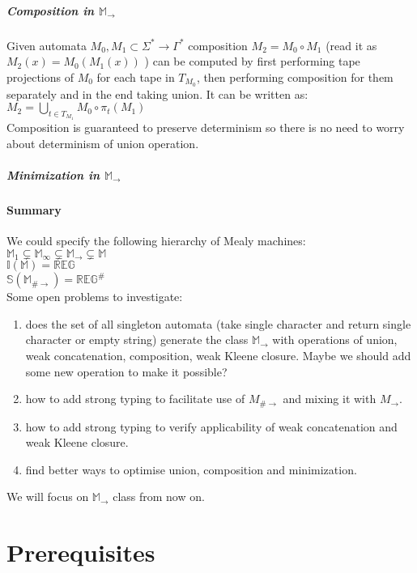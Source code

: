 \documentclass[12pt]{article}
\begin{document}
\subparagraph{Composition in $\mathbb{M}_\rightarrow$} Given automata $M_0,M_1 \subset \Sigma^* \rightarrow \Gamma^*$ composition $M_2=M_0 \circ M_1$ (read it as $M_2(x) = M_0(M_1(x))$ ) can be computed by first performing tape projections of $M_0$ for each tape in $T_{M_0}$, then performing composition for them separately and in the end taking union. It can be written as: \\
$M_2 = \bigcup_{t\in T_{M_1}} M_0 \circ \pi_t(M_1)$ \\
Composition is guaranteed to preserve determinism so there is no need to worry about determinism of union operation.







\subparagraph{Minimization in $\mathbb{M}_\rightarrow$} 



\paragraph{Summary} We could specify the following hierarchy of Mealy machines: \\
$\mathbb{M}_1 \subsetneq \mathbb{M}_\infty \subsetneq \mathbb{M}_\rightarrow \subsetneq \mathbb{M}$ \\
$\mathbb{I}(\mathbb{M}) = \mathbb{REG}$ \\
$\mathbb{S}(\mathbb{M}_{\#\rightarrow}) = \mathbb{REG}^\#$ \\
Some open problems to investigate: 
\begin{enumerate}
	\item does the set of all singleton automata  (take single character and return single character or empty string) generate the class $\mathbb{ M}_\rightarrow$ with operations of union, weak concatenation, composition, weak Kleene closure. Maybe  we should add some new operation to make it possible?
	\item how to add strong typing to facilitate use of $M_{\#\rightarrow}$ and mixing it with $M_{\rightarrow}$.
	\item how to add strong typing to verify applicability of weak concatenation and weak Kleene closure.
	\item find better ways to optimise union, composition and minimization.
\end{enumerate}
We will focus on $\mathbb{M}_\rightarrow$ class from now on.
\section{Prerequisites}
\end{document}
